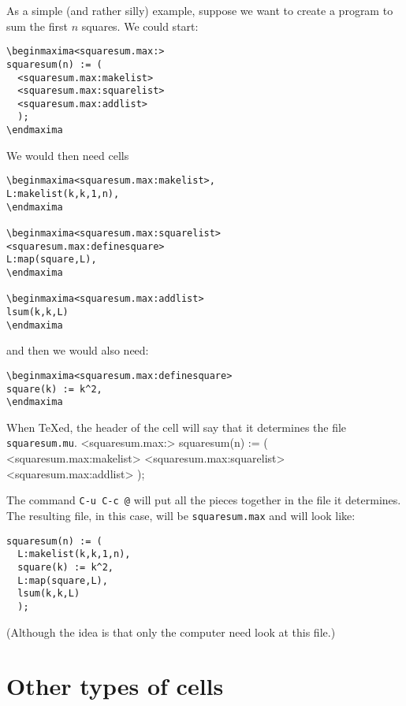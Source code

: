 \documentclass{article}
\begin{document}
As a simple (and rather silly) example, suppose we want to create a
program to sum the first $n$ squares.  We could start:
\begin{verbatim}
\beginmaxima<squaresum.max:>
squaresum(n) := (
  <squaresum.max:makelist>
  <squaresum.max:squarelist>
  <squaresum.max:addlist>
  );        
\endmaxima
\end{verbatim}
\noindent
We would then need cells
\begin{verbatim}
\beginmaxima<squaresum.max:makelist>,
L:makelist(k,k,1,n),
\endmaxima

\beginmaxima<squaresum.max:squarelist>
<squaresum.max:definesquare>
L:map(square,L),
\endmaxima

\beginmaxima<squaresum.max:addlist>
lsum(k,k,L)
\endmaxima
\end{verbatim}
\noindent
and then we would also need:
\begin{verbatim}
\beginmaxima<squaresum.max:definesquare>
square(k) := k^2,
\endmaxima
\end{verbatim}
\noindent
When \TeX{}ed, the header of the cell will say that it determines the
file \texttt{squaresum.mu}.  
\beginmaxima<squaresum.max:>
squaresum(n) := (
  <squaresum.max:makelist>
  <squaresum.max:squarelist>
  <squaresum.max:addlist>
  );        
\endmaxima

The command 
\texttt{C-u C-c @} will put all the pieces
together in the file it determines.  The resulting file, in this case,
will be \texttt{squaresum.max} and will look like:
\begin{verbatim}
squaresum(n) := (
  L:makelist(k,k,1,n),
  square(k) := k^2,
  L:map(square,L),
  lsum(k,k,L)
  );        
\end{verbatim}
\noindent
(Although the idea is that only the computer need look at this file.)

\section{Other types of cells}
\end{document}
